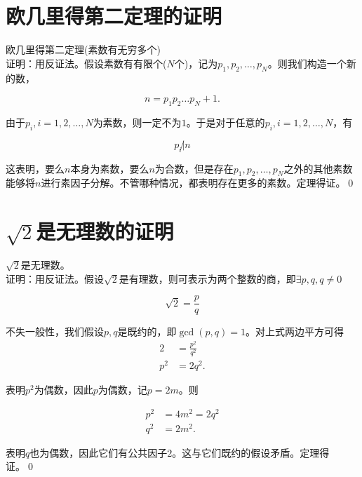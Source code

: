 \appendix

\chapter{欧几里得第二定理的证明}
\label{appendix:apps}

	\begin{theorem}
		欧几里得第二定理(素数有无穷多个)\\
		证明：用反证法。假设素数有有限个($N$个)，记为$p_1,p_2,\dots,p_N$。则我们构造一个新的数，
		
		\[n=p_1p_2\dots p_N+1.\]
		
		由于$p_i,i=1,2,\dots,N$为素数，则一定不为$1$。于是对于任意的$p_i,i=1,2,\dots, N$，有
		
		\[p_i\not|n\]
		
		这表明，要么$n$本身为素数，要么$n$为合数，但是存在$p_1,p_2,\dots,p_N$之外的其他素数能够将$n$进行素因子分解。不管哪种情况，都表明存在更多的素数。定理得证。\qed
	\end{theorem}

\chapter{$\sqrt{2}$是无理数的证明}
	\begin{theorem}
		$\sqrt{2}$是无理数。\\
		证明：用反证法。假设$\sqrt{2}$是有理数，则可表示为两个整数的商，即$\exists p,q, q\ne0$
		
		\[\sqrt{2}=\frac{p}{q}\]
		
		不失一般性，我们假设$p,q$是既约的，即$\gcd(p,q)=1$。对上式两边平方可得\\
		
		\begin{align*}
			2& =\frac{p^2}{q^2}\\
			p^2&=2q^2.
		\end{align*}
		
		表明$p^2$为偶数，因此$p$为偶数，记$p=2m$。则
		
		\begin{align*}
			p^2&=4m^2=2q^2\\
			q^2&=2m^2.
		\end{align*}
		
		表明$q$也为偶数，因此它们有公共因子$2$。这与它们既约的假设矛盾。定理得证。\qed
	\end{theorem} 